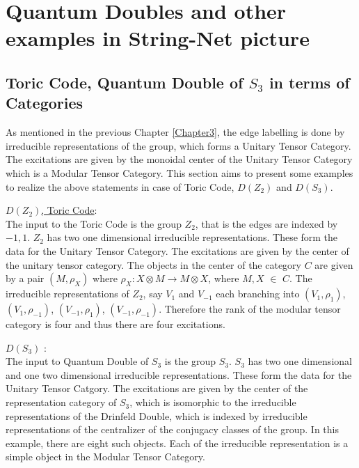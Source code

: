 
\chapter{Quantum Doubles and other examples in String-Net picture} %

\label{Chapter4} %



\section{Toric Code, Quantum Double of $S_{3}$ in terms of Categories}
            As mentioned in the previous Chapter \ref{Chapter3}, the edge labelling is done by irreducible representations of the group, which forms a Unitary Tensor Category. 
The excitations are given by the monoidal center of the Unitary Tensor Category which is a Modular Tensor Category. This section aims to present some examples to realize the
above statements in case of Toric Code, $D(Z_{2})$ and $D(S_{3})$. 

\underline{$D(Z_{2})$, Toric Code}:\\
         The input to the Toric Code is the group $Z_{2}$, that is the edges are indexed by ${-1, 1}$. $Z_{2}$ has two one dimensional irreducible representations. These form
the data for the Unitary Tensor Category. The excitations are given by the center of the unitary tensor category. The objects in the center of the category $C$ are given by a pair 
$(M, \rho_{X})$ where $\rho_{X} : X \otimes M \rightarrow M \otimes X$, where $M, X$ $\in$ $C$. The irreducible representations of $Z_{2}$, say $V_{1}$ and $V_{-1}$ each branching 
into $(V_{1},\rho_{1})$, $(V_{1},\rho_{-1})$, $(V_{-1},\rho_{1})$, $(V_{-1},\rho_{-1})$. Therefore the rank of the modular tensor category is four and thus there are four excitations.

\underline{$D(S_{3})$} : \\
	The input to Quantum Double of $S_{3}$ is the group $S_{3}$. $S_{3}$ has two one dimensional and one two dimensional irreducible representations. These form the data for the Unitary Tensor Catgory. 
The excitations are given by the center of the representation category of $S_{3}$, which is isomorphic to the irreducible representations of the Drinfeld Double, which is indexed by irreducible 
representations of the centralizer of the conjugacy classes of the group. In this example, there are eight such objects. Each of the irreducible representation is a simple object in the Modular Tensor 
Category.
 
